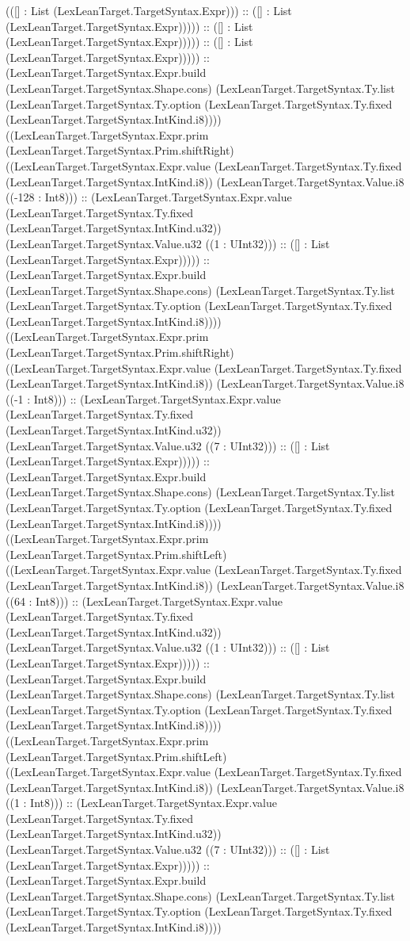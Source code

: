 \documentclass[11pt]{article}
\begin{document}
(([] : List (LexLeanTarget.TargetSyntax.Expr))) :: ([] : List (LexLeanTarget.TargetSyntax.Expr))))) :: ([] : List (LexLeanTarget.TargetSyntax.Expr))))) :: ([] : List (LexLeanTarget.TargetSyntax.Expr))))) :: (LexLeanTarget.TargetSyntax.Expr.build (LexLeanTarget.TargetSyntax.Shape.cons) (LexLeanTarget.TargetSyntax.Ty.list (LexLeanTarget.TargetSyntax.Ty.option (LexLeanTarget.TargetSyntax.Ty.fixed (LexLeanTarget.TargetSyntax.IntKind.i8)))) ((LexLeanTarget.TargetSyntax.Expr.prim (LexLeanTarget.TargetSyntax.Prim.shiftRight) ((LexLeanTarget.TargetSyntax.Expr.value (LexLeanTarget.TargetSyntax.Ty.fixed (LexLeanTarget.TargetSyntax.IntKind.i8)) (LexLeanTarget.TargetSyntax.Value.i8 ((-128 : Int8))) :: (LexLeanTarget.TargetSyntax.Expr.value (LexLeanTarget.TargetSyntax.Ty.fixed (LexLeanTarget.TargetSyntax.IntKind.u32)) (LexLeanTarget.TargetSyntax.Value.u32 ((1 : UInt32))) :: ([] : List (LexLeanTarget.TargetSyntax.Expr))))) :: (LexLeanTarget.TargetSyntax.Expr.build (LexLeanTarget.TargetSyntax.Shape.cons) (LexLeanTarget.TargetSyntax.Ty.list (LexLeanTarget.TargetSyntax.Ty.option (LexLeanTarget.TargetSyntax.Ty.fixed (LexLeanTarget.TargetSyntax.IntKind.i8)))) ((LexLeanTarget.TargetSyntax.Expr.prim (LexLeanTarget.TargetSyntax.Prim.shiftRight) ((LexLeanTarget.TargetSyntax.Expr.value (LexLeanTarget.TargetSyntax.Ty.fixed (LexLeanTarget.TargetSyntax.IntKind.i8)) (LexLeanTarget.TargetSyntax.Value.i8 ((-1 : Int8))) :: (LexLeanTarget.TargetSyntax.Expr.value (LexLeanTarget.TargetSyntax.Ty.fixed (LexLeanTarget.TargetSyntax.IntKind.u32)) (LexLeanTarget.TargetSyntax.Value.u32 ((7 : UInt32))) :: ([] : List (LexLeanTarget.TargetSyntax.Expr))))) :: (LexLeanTarget.TargetSyntax.Expr.build (LexLeanTarget.TargetSyntax.Shape.cons) (LexLeanTarget.TargetSyntax.Ty.list (LexLeanTarget.TargetSyntax.Ty.option (LexLeanTarget.TargetSyntax.Ty.fixed (LexLeanTarget.TargetSyntax.IntKind.i8)))) ((LexLeanTarget.TargetSyntax.Expr.prim (LexLeanTarget.TargetSyntax.Prim.shiftLeft) ((LexLeanTarget.TargetSyntax.Expr.value (LexLeanTarget.TargetSyntax.Ty.fixed (LexLeanTarget.TargetSyntax.IntKind.i8)) (LexLeanTarget.TargetSyntax.Value.i8 ((64 : Int8))) :: (LexLeanTarget.TargetSyntax.Expr.value (LexLeanTarget.TargetSyntax.Ty.fixed (LexLeanTarget.TargetSyntax.IntKind.u32)) (LexLeanTarget.TargetSyntax.Value.u32 ((1 : UInt32))) :: ([] : List (LexLeanTarget.TargetSyntax.Expr))))) :: (LexLeanTarget.TargetSyntax.Expr.build (LexLeanTarget.TargetSyntax.Shape.cons) (LexLeanTarget.TargetSyntax.Ty.list (LexLeanTarget.TargetSyntax.Ty.option (LexLeanTarget.TargetSyntax.Ty.fixed (LexLeanTarget.TargetSyntax.IntKind.i8)))) ((LexLeanTarget.TargetSyntax.Expr.prim (LexLeanTarget.TargetSyntax.Prim.shiftLeft) ((LexLeanTarget.TargetSyntax.Expr.value (LexLeanTarget.TargetSyntax.Ty.fixed (LexLeanTarget.TargetSyntax.IntKind.i8)) (LexLeanTarget.TargetSyntax.Value.i8 ((1 : Int8))) :: (LexLeanTarget.TargetSyntax.Expr.value (LexLeanTarget.TargetSyntax.Ty.fixed (LexLeanTarget.TargetSyntax.IntKind.u32)) (LexLeanTarget.TargetSyntax.Value.u32 ((7 : UInt32))) :: ([] : List (LexLeanTarget.TargetSyntax.Expr))))) :: (LexLeanTarget.TargetSyntax.Expr.build (LexLeanTarget.TargetSyntax.Shape.cons) (LexLeanTarget.TargetSyntax.Ty.list (LexLeanTarget.TargetSyntax.Ty.option (LexLeanTarget.TargetSyntax.Ty.fixed (LexLeanTarget.TargetSyntax.IntKind.i8)))) 
\end{document}
